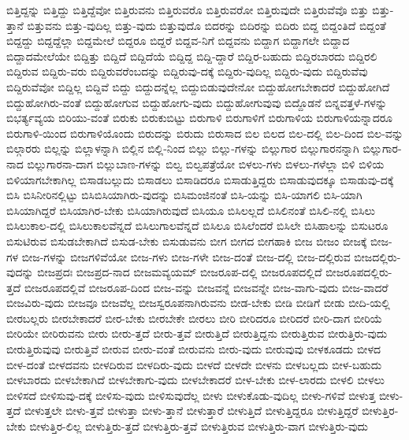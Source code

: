 {ಬಿತ್ತಿದ್ದನ್ನು
ಬಿತ್ತಿದ್ದು
ಬಿತ್ತಿದ್ದೆವೋ
ಬಿತ್ತಿರುವನು
ಬಿತ್ತಿರುವರೊ
ಬಿತ್ತಿರುವರೋ
ಬಿತ್ತಿರುವುದೇ
ಬಿತ್ತಿರುವೆವೊ
ಬಿತ್ತು
ಬಿತ್ತು-ತ್ತಾನೆ
ಬಿತ್ತುವನು
ಬಿತ್ತು-ವುದಿಲ್ಲ
ಬಿತ್ತು-ವುದು
ಬಿತ್ತುವುದೊ
ಬಿದರನ್ನು
ಬಿದಿರನ್ನು
ಬಿದಿರು
ಬಿದ್ದ
ಬಿದ್ದಂತಿದೆ
ಬಿದ್ದಂತೆ
ಬಿದ್ದದ್ದು
ಬಿದ್ದದ್ದೆಲ್ಲಾ
ಬಿದ್ದಮೇಲೆ
ಬಿದ್ದರೂ
ಬಿದ್ದರೆ
ಬಿದ್ದವ-ನಿಗೆ
ಬಿದ್ದವನು
ಬಿದ್ದಾಗ
ಬಿದ್ದಾಗಲೇ
ಬಿದ್ದಾದ
ಬಿದ್ದಾದಮೇಲೆಯೇ
ಬಿದ್ದಿತ್ತು
ಬಿದ್ದಿದೆ
ಬಿದ್ದಿದೆಯೆ
ಬಿದ್ದಿದ್ದ
ಬಿದ್ದಿ-ದ್ದಾರೆ
ಬಿದ್ದಿರ-ಬಹುದು
ಬಿದ್ದಿರಬಾರದು
ಬಿದ್ದಿರಲಿ
ಬಿದ್ದಿರುವ
ಬಿದ್ದಿರು-ವರು
ಬಿದ್ದಿರುವರೆಂಬದನ್ನು
ಬಿದ್ದಿರುವು-ದಕ್ಕೆ
ಬಿದ್ದಿರು-ವುದಿಲ್ಲ
ಬಿದ್ದಿರು-ವುದು
ಬಿದ್ದಿರುವೆವು
ಬಿದ್ದಿರುವೆವೋ
ಬಿದ್ದಿಲ್ಲ
ಬಿದ್ದಿವೆ
ಬಿದ್ದು
ಬಿದ್ದುದನ್ನೆಲ್ಲ
ಬಿದ್ದುಬಿಡುವುದೇನೋ
ಬಿದ್ದುಹೋಗಬೇಕಾದರೆ
ಬಿದ್ದುಹೋಗಿದೆ
ಬಿದ್ದುಹೋಗಿರು-ವಂತೆ
ಬಿದ್ದುಹೋಗುವ
ಬಿದ್ದುಹೋಗು-ವುದು
ಬಿದ್ದುಹೋಗುವುವು
ಬಿದ್ದೊಡನೆ
ಬಿನ್ನವತ್ತಳೆ-ಗಳನ್ನು
ಬಿಭರ್ತ್ಯವ್ಯಯ
ಬಿರಿಯು-ವಂತೆ
ಬಿರುಕು
ಬಿರುಕುಬಿಟ್ಟು
ಬಿರುಗಾಳಿ
ಬಿರುಗಾಳಿಗೆ
ಬಿರುಗಾಳಿಯ
ಬಿರುಗಾಳಿಯನ್ನಾದರೂ
ಬಿರುಗಾಳಿ-ಯಿಂದ
ಬಿರುಗಾಳಿಯೊಂದು
ಬಿರುದನ್ನು
ಬಿರುದು
ಬಿರುಸಾದ
ಬಿಲ
ಬಿಲದ
ಬಿಲ-ದಲ್ಲಿ
ಬಿಲ-ದಿಂದ
ಬಿಲ-ವನ್ನು
ಬಿಲ್ಗಾರರು
ಬಿಲ್ಲನ್ನು
ಬಿಲ್ಲಾಳನ್ನಾಗಿ
ಬಿಲ್ಲಿನ
ಬಿಲ್ಲಿ-ನಿಂದ
ಬಿಲ್ಲು
ಬಿಲ್ಲು-ಗಳನ್ನು
ಬಿಲ್ಲುಗಾರ
ಬಿಲ್ಲುಗಾರನನ್ನಾಗಿ
ಬಿಲ್ಲುಗಾರ-ನಾದ
ಬಿಲ್ಲುಗಾರನಾ-ದಾಗ
ಬಿಲ್ಲುಬಾಣ-ಗಳನ್ನು
ಬಿಲ್ವ
ಬಿಲ್ವಪತ್ರೆಯೋ
ಬಿಳಲು-ಗಳು
ಬಿಳಲು-ಗಳೆಲ್ಲಾ
ಬಿಳಿ
ಬಿಳಿಯ
ಬಿಳಿಯಾಗಬೇಕಾಗಿಲ್ಲ
ಬಿಸಾಡಬಲ್ಲುದು
ಬಿಸಾಡಲು
ಬಿಸಾಡಿದರೂ
ಬಿಸಾಡುತ್ತಿದ್ದರು
ಬಿಸಾಡುವುದಕ್ಕೂ
ಬಿಸಾಡುವು-ದಕ್ಕೆ
ಬಿಸಿ
ಬಿಸಿನೀರಿನಲ್ಲಿಟ್ಟು
ಬಿಸಿಬಿಸಿಯಾಗಿರು-ವುದನ್ನು
ಬಿಸಿಮಂಜಿನಂತೆ
ಬಿಸಿ-ಯನ್ನು
ಬಿಸಿ-ಯಾಗಲಿ
ಬಿಸಿ-ಯಾಗಿ
ಬಿಸಿಯಾಗಿದ್ದರೆ
ಬಿಸಿಯಾಗಿರ-ಬೇಕು
ಬಿಸಿಯಾಗಿರುವುದೆ
ಬಿಸಿಯೂ
ಬಿಸಿಲಲ್ಲದೆ
ಬಿಸಿಲಿನಂತೆ
ಬಿಸಿಲಿ-ನಲ್ಲಿ
ಬಿಸಿಲು
ಬಿಸಿಲುಕಾಲ-ದಲ್ಲಿ
ಬಿಸಿಲುಕಾಲವೆನ್ನದೆ
ಬಿಸಿಲುಗಾಲವೆನ್ನದೆ
ಬಿಸಿಲೂ
ಬಿಸಿಲೆಂದರೆ
ಬಿಸಿಲೇ
ಬಿಸಿಹಾಲನ್ನು
ಬಿಸುಟರೂ
ಬಿಸುಟಿರುವ
ಬಿಸುಡಬೇಕಾಗಿದೆ
ಬಿಸುಡ-ಬೇಕು
ಬಿಸುಡುವನು
ಬೀಗ
ಬೀಗದ
ಬೀಗಹಾಕಿ
ಬೀಜ
ಬೀಜಂ
ಬೀಜಕ್ಕೆ
ಬೀಜ-ಗಳ
ಬೀಜ-ಗಳನ್ನು
ಬೀಜಗಳಿವೆಯೋ
ಬೀಜ-ಗಳು
ಬೀಜ-ಗಳೇ
ಬೀಜ-ದಂತೆ
ಬೀಜ-ದಲ್ಲಿ
ಬೀಜ-ದಲ್ಲಿರುವ
ಬೀಜದಲ್ಲಿರು-ವುದನ್ನು
ಬೀಜಪ್ರದಃ
ಬೀಜಪ್ರದ-ನಾದ
ಬೀಜಮವ್ಯಯಮ್
ಬೀಜರೂಪ-ದಲ್ಲಿ
ಬೀಜರೂಪದಲ್ಲಿದೆ
ಬೀಜರೂಪದಲ್ಲಿರು-ತ್ತದೆ
ಬೀಜರೂಪದಲ್ಲಿವೆ
ಬೀಜರೂಪ-ದಿಂದ
ಬೀಜ-ವನ್ನು
ಬೀಜವನ್ನೆ
ಬೀಜವನ್ನೇ
ಬೀಜ-ವಾಗು-ವುದು
ಬೀಜ-ವಾದರೆ
ಬೀಜವಿರು-ವುದು
ಬೀಜವೂ
ಬೀಜವೆಲ್ಲ
ಬೀಜಸ್ವರೂಪನಾಗಿರುವನು
ಬೀಡ-ಬೇಕು
ಬೀಡಿ
ಬೀಡಿಗೆ
ಬೀಡು
ಬೀದಿ-ಯಲ್ಲಿ
ಬೀರಬಲ್ಲರು
ಬೀರಬೇಕಾದರೆ
ಬೀರ-ಬೇಕು
ಬೀರಬೇಕೇ
ಬೀರಲು
ಬೀರಿ
ಬೀರಿದರೂ
ಬೀರಿದರೆ
ಬೀರಿ-ದಾಗ
ಬೀರಿಯೆ
ಬೀರಿಯೇ
ಬೀರಿರುವನು
ಬೀರು
ಬೀರು-ತ್ತದೆ
ಬೀರು-ತ್ತವೆ
ಬೀರುತ್ತಿದೆ
ಬೀರುತ್ತಿದ್ದನು
ಬೀರುತ್ತಿರುವ
ಬೀರುತ್ತಿರು-ವುದು
ಬೀರುತ್ತಿರುವುವು
ಬೀರುತ್ತಿವೆ
ಬೀರುವ
ಬೀರು-ವಂತೆ
ಬೀರುವನು
ಬೀರು-ವುದು
ಬೀರುವುವು
ಬೀಳಕೂಡದು
ಬೀಳದ
ಬೀಳ-ದಂತೆ
ಬೀಳದವನು
ಬೀಳದಿರುವ
ಬೀಳದಿರು-ವುದು
ಬೀಳದೆ
ಬೀಳದೇ
ಬೀಳನು
ಬೀಳಬಲ್ಲದು
ಬೀಳ-ಬಹುದು
ಬೀಳಬಾರದು
ಬೀಳಬೇಕಾಗಿದೆ
ಬೀಳಬೇಕಾಗು-ವುದು
ಬೀಳಬೇಕಾದರೆ
ಬೀಳ-ಬೇಕು
ಬೀಳ-ಲಾರದು
ಬೀಳಲಿ
ಬೀಳಲು
ಬೀಳಿಸದೆ
ಬೀಳಿಸುವು-ದಕ್ಕೆ
ಬೀಳಿಸು-ವುದು
ಬೀಳಿಸುವುದೆಲ್ಲ
ಬೀಳು
ಬೀಳುಕೊಡು-ವುದಿಲ್ಲ
ಬೀಳು-ಗಳಿವೆ
ಬೀಳುತ್ತ
ಬೀಳು-ತ್ತದೆ
ಬೀಳುತ್ತಲೇ
ಬೀಳು-ತ್ತವೆ
ಬೀಳುತ್ತಾ
ಬೀಳು-ತ್ತಾನೆ
ಬೀಳುತ್ತಾರೆ
ಬೀಳುತ್ತಿದೆ
ಬೀಳುತ್ತಿದ್ದರೂ
ಬೀಳುತ್ತಿದ್ದರೆ
ಬೀಳುತ್ತಿರ-ಬೇಕು
ಬೀಳುತ್ತಿರ-ಲಿಲ್ಲ
ಬೀಳುತ್ತಿರು-ತ್ತದೆ
ಬೀಳುತ್ತಿರು-ತ್ತವೆ
ಬೀಳುತ್ತಿರುವ
ಬೀಳುತ್ತಿರು-ವಾಗ
ಬೀಳುತ್ತಿರು-ವುದು
}

